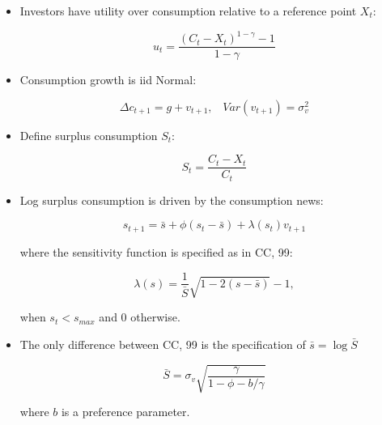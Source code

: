 \documentclass{article}
\begin{document}
\begin{itemize}

\item Investors have utility over consumption relative to a reference point $X_t$:

$$
u_t = \frac{(C_t - X_t)^{1-\gamma} - 1}{1-\gamma}
$$

\item Consumption growth is iid Normal:

$$
\Delta c_{t+1} = g + v_{t +1}, \;\;\; Var(v_{t+1}) = \sigma_v^2
$$

\item Define surplus consumption $S_t$:

$$
S_t = \frac{C_t - X_t}{C_t}
$$

\item Log surplus consumption is driven by the consumption news:

$$
s_{t+1} = \bar{s} + \phi(s_t - \bar{s}) + \lambda(s_t) v_{t+1}
$$

where the sensitivity function is specified as in CC, 99:

$$
\lambda(s) = \frac{1}{\bar{S}} \sqrt{1 - 2(s-\bar{s})} - 1,
$$

when $s_t < s_{max}$ and 0 otherwise.

\item The only difference between CC, 99 is the specification of $\bar{s} = \log \bar{S}$

$$
\bar{S} = \sigma_v \sqrt{\frac{\gamma}{1- \phi - b/\gamma}}
$$

where $b$ is a preference parameter.

\end{itemize}
\end{document}
